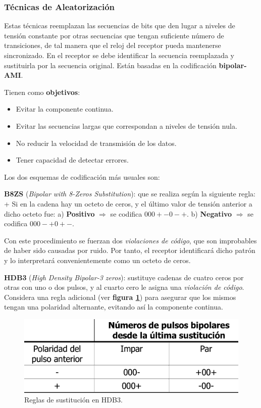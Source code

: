 \documentclass[10pt,a4paper]{article}
\begin{document}
\subsubsection{Técnicas de Aleatorización}

Estas técnicas reemplazan las secuencias de bits que den lugar a niveles de tensión constante por otras secuencias que tengan suficiente número de transiciones, de tal manera que el reloj del receptor pueda mantenerse sincronizado. En el receptor se debe identificar la secuencia reemplazada y sustituirla por la secuencia original. Están basadas en la codificación \textbf{bipolar-AMI}.

Tienen como \textbf{objetivos}:
\begin{itemize}
\item Evitar la componente continua.
\item Evitar las secuencias largas que correspondan a niveles de tensión nula.
\item No reducir la velocidad de transmisión de los datos.
\item Tener capacidad de detectar errores.
\end{itemize}

Los dos esquemas de codificación más usuales son:
\begin{description}
\item \textbf{B8ZS} (\textit{Bipolar with 8-Zeros Substitution}): que se realiza según la siguiente regla:
\subitem + Si en la cadena hay un octeto de ceros, y el último valor de tensión anterior a dicho octeto fue:
\subitem a) \textbf{Positivo} $\Rightarrow$ se codifica $000+-0-+$.
\subitem b) \textbf{Negativo} $\Rightarrow$ se codifica $000-+0+-$.

Con este procedimiento se fuerzan dos \textit{violaciones de código}, que son improbables de haber sido causadas por ruido. Por tanto, el receptor identificará dicho patrón y lo interpretará convenientemente como un octeto de ceros.
\item \textbf{HDB3} (\textit{High Density Bipolar-3 zeros}): sustituye cadenas de cuatro ceros por otras con uno o dos pulsos, y al cuarto cero le asigna una \textit{violación de código}. Considera una regla adicional (ver \textbf{figura \ref{fig:hdb3}}) para asegurar que los mismos tengan una polaridad alternante, evitando así la componente continua.
\end{description}

\begin{figure}[ht!]
  \caption{Reglas de sustitución en HDB3.}
  \label{fig:hdb3}  
  \centerline{
	\includegraphics[width=0.5\textwidth-\fboxrule-\fboxrule]{imgs/hdb3.png}}
\end{figure}
\end{document}
